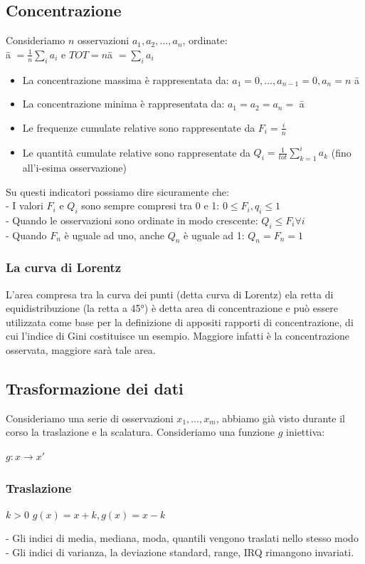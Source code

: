 \subsection{Concentrazione}
Consideriamo $n$ osservazioni $a_1, a_2, ..., a_n$, ordinate: \\
\={a} $= \frac{1}{n} \sum_i a_i$ e $TOT = n$\={a} $= \sum_i a_i$
\begin{itemize}
\item La concentrazione massima è rappresentata da: $ a_1 = 0, ..., a_{n-1} = 0, a_n = n $ \={a} 
\item La concentrazione minima è rappresentata da: $a_1 = a_2 = a_n =$ \={a}
\item Le frequenze cumulate relative sono rappresentate da $F_i = \frac{i}{n}$
\item Le quantità cumulate relative sono rappresentate da $Q_i = \frac{1}{tot} \sum_{k=1}^i a_k$ (fino all'i-esima osservazione)
\end{itemize}
Su questi indicatori possiamo dire sicuramente che:\\
- I valori $F_i$ e $Q_i$ sono sempre compresi tra 0 e 1: $0 \leq F_i, q_i \leq 1$  \\
- Quando le osservazioni sono ordinate in modo crescente: $Q_i \leq F_i \forall i$ \\
- Quando $F_n$ è uguale ad uno, anche $Q_n$ è uguale ad 1: $Q_n = F_n = 1$

\subsubsection{La curva di Lorentz}
L'area compresa tra la curva dei punti (detta curva di Lorentz) ela retta di equidistribuzione (la retta a 45°) è detta area di concentrazione e può essere utilizzata come base per la definizione di appositi rapporti di concentrazione, di cui l'indice di Gini costituisce un esempio. Maggiore infatti è la concentrazione osservata, maggiore sarà tale area.

\subsection{Trasformazione dei dati}
Consideriamo una serie di osservazioni $x_1, ..., x_m$, abbiamo già visto durante il corso la traslazione e la scalatura.
Consideriamo una funzione $g$ iniettiva:\begin{center}
$g: x \rightarrow x'$
\end{center}
\subsubsection{Traslazione}
\begin{center}
$k > 0$ $g(x) = x + k, g(x) = x-k$
\end{center}
- Gli indici di media, mediana, moda, quantili vengono traslati nello stesso modo\\
- Gli indici di varianza, la deviazione standard, range, IRQ rimangono invariati.
